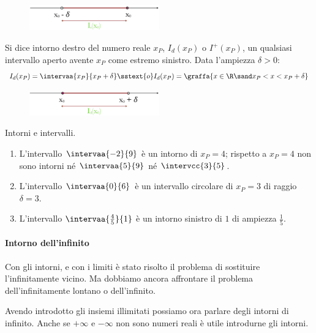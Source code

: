 \begin{figure}[h!]
\centering
\includegraphics[width=0.5\textwidth]{img/top_3.png}%
\end{figure}

\begin{newdef}{}{}
Si dice intorno destro del numero reale \(x_P\), \(I_d(x_P)\) o 
\(I^+(x_P)\), un qualsiasi intervallo aperto avente \(x_P\) come estremo 
sinistro. 
Data l'ampiezza \(\delta > 0\):
\[I_d(x_P) = \intervaa{x_P}{x_P+\delta} \sstext{o} 
  I_d(x_P) = \graffa{x \in \R \sand x_P < x < x_P+\delta}\]
\end{newdef}

\begin{figure}[h!]
\centering
\includegraphics[width=0.5\textwidth]{img/top_4a.png}%
\end{figure}

\begin{esempio} Intorni e intervalli.
\begin{enumerate}[label=\alph*)]
\item L'intervallo \(\intervaa{-2}{9}\) è un intorno di \(x_P=4\); rispetto 
a 
\(x_P=4\) non sono intorni né \(\intervaa{5}{9}\) né \(\intervcc{3}{5}\).
\item L'intervallo \(\intervaa{0}{6}\) è un intervallo circolare di 
\(x_P=3\) 
di raggio \(\delta=3\).
\item L'intervallo \(\intervaa{\frac{4}{5}}{1}\) è un intorno sinistro di 
\(1\) di ampiezza \(\frac{1}{5}\). 
\end{enumerate}
\end{esempio}

\paragraph{Intorno dell'infinito}

Con gli intorni, e con i limiti è stato risolto il problema di sostituire 
l'infinitamente vicino.
Ma dobbiamo ancora affrontare il problema dell'infinitamente lontano o 
dell'infinito.

Avendo introdotto gli insiemi illimitati possiamo ora parlare degli intorni 
di infinito. Anche se 
\(+\infty\) e \(-\infty\) non sono numeri reali è utile 
introdurne gli intorni.

